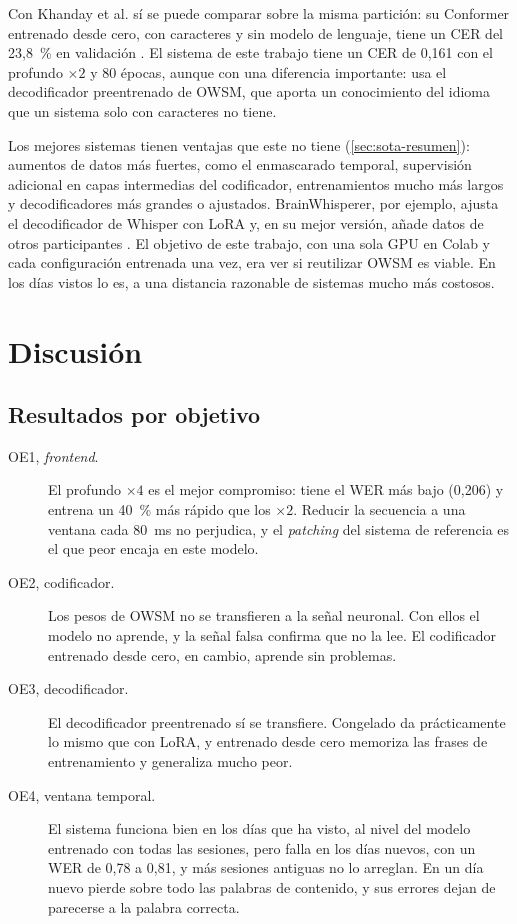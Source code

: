 Con Khanday et al. sí se puede comparar sobre la misma partición: su Conformer entrenado desde cero, con caracteres y sin modelo de lenguaje, tiene un CER del 23,8~\% en validación \cite{khanday2026}. El sistema de este trabajo tiene un CER de 0,161 con el profundo $\times 2$ y 80 épocas, aunque con una diferencia importante: usa el decodificador preentrenado de OWSM, que aporta un conocimiento del idioma que un sistema solo con caracteres no tiene.

Los mejores sistemas tienen ventajas que este no tiene (\cref{sec:sota-resumen}): aumentos de datos más fuertes, como el enmascarado temporal, supervisión adicional en capas intermedias del codificador, entrenamientos mucho más largos y decodificadores más grandes o ajustados. BrainWhisperer, por ejemplo, ajusta el decodificador de Whisper con LoRA y, en su mejor versión, añade datos de otros participantes \cite{brainwhisperer}. El objetivo de este trabajo, con una sola GPU en Colab y cada configuración entrenada una vez, era ver si reutilizar OWSM es viable. En los días vistos lo es, a una distancia razonable de sistemas mucho más costosos.

\section{Discusión}
\label{sec:discusion}

\subsection{Resultados por objetivo}

\begin{description}
  \item[OE1, \textit{frontend}.] El profundo $\times 4$ es el mejor compromiso: tiene el WER más bajo (0,206) y entrena un 40~\% más rápido que los $\times 2$. Reducir la secuencia a una ventana cada 80~ms no perjudica, y el \textit{patching} del sistema de referencia es el que peor encaja en este modelo.
  \item[OE2, codificador.] Los pesos de OWSM no se transfieren a la señal neuronal. Con ellos el modelo no aprende, y la señal falsa confirma que no la lee. El codificador entrenado desde cero, en cambio, aprende sin problemas.
  \item[OE3, decodificador.] El decodificador preentrenado sí se transfiere. Congelado da prácticamente lo mismo que con LoRA, y entrenado desde cero memoriza las frases de entrenamiento y generaliza mucho peor.
  \item[OE4, ventana temporal.] El sistema funciona bien en los días que ha visto, al nivel del modelo entrenado con todas las sesiones, pero falla en los días nuevos, con un WER de 0,78 a 0,81, y más sesiones antiguas no lo arreglan. En un día nuevo pierde sobre todo las palabras de contenido, y sus errores dejan de parecerse a la palabra correcta.
\end{description}

